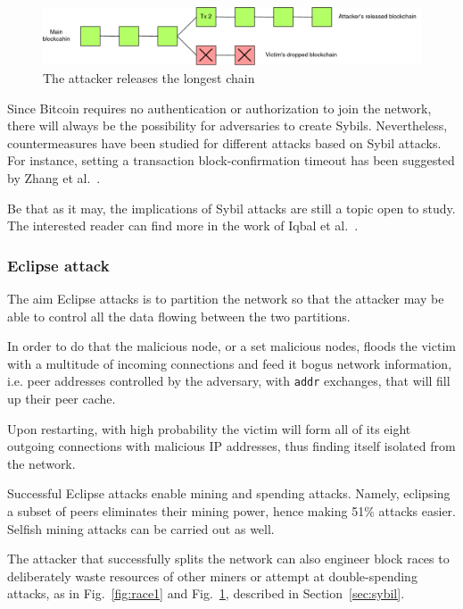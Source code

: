 \documentclass[12pt, letterpaper, twoside]{article}
\begin{document}
\begin{figure}[h!]
	\includegraphics[width=.9\textwidth]{pict/blockrace2.png}
	\centering
	\caption{The attacker releases the longest chain}
	\label{fig:race2}
\end{figure}

Since Bitcoin requires no authentication or authorization to join the network, there will always be the possibility for adversaries to create Sybils. Nevertheless, countermeasures have been studied for different attacks based on Sybil attacks. For instance, setting a transaction block-confirmation timeout has been suggested by Zhang et al.~\cite{zhang-sybil-mitigations}.

Be that as it may, the implications of Sybil attacks are still a topic open to study. The interested reader can find more in the work of Iqbal et al.~\cite{iqbal-sybil}.

\subsubsection{Eclipse attack}\label{sec:eclipse}
The aim Eclipse attacks is to partition the network so that the attacker may be able to control all the data flowing between the two partitions.

In order to do that the malicious node, or a set malicious nodes, floods the victim with a multitude of incoming connections and feed it bogus network information, i.e. peer addresses controlled by the adversary, with \texttt{addr} exchanges, that will fill up their peer cache.

Upon restarting, with high probability the victim will form all of its eight outgoing connections with malicious IP addresses, thus finding itself isolated from the network.

Successful Eclipse attacks enable mining and spending attacks. Namely, eclipsing a subset of peers eliminates their mining power, hence making 51\% attacks easier. Selfish mining attacks can be carried out as well.

The attacker that successfully splits the network can also engineer block races to deliberately waste resources of other miners or attempt at double-spending attacks, as in Fig.~\ref{fig:race1} and Fig.~\ref{fig:race2}, described in Section~\ref{sec:sybil}.
\end{document}
